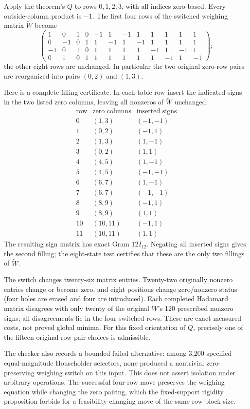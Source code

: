 Apply the theorem's $Q$ to rows $0,1,2,3$, with all indices zero-based.
Every outside-column product is $-1$. The first four rows of the
switched weighing matrix $\widetilde W$ become
\[
\begin{pmatrix}
1&0&1&0&-1&1&-1&1&1&1&1&1\\
0&-1&0&1&1&-1&1&-1&1&1&1&1\\
-1&0&1&0&1&1&1&1&-1&1&-1&1\\
0&1&0&1&1&1&1&1&1&-1&1&-1
\end{pmatrix};
\]
the other eight rows are unchanged. In particular the two original
zero-row pairs are reorganized into pairs $(0,2)$ and $(1,3)$.

Here is a complete filling certificate. In each table row insert
the indicated signs in the two listed zero columns, leaving all
nonzeros of $\widetilde W$ unchanged:
\[
\begin{array}{c|c|c}
\text{row}&\text{zero columns}&\text{inserted signs}\\\hline
0&(1,3)&(-1,-1)\\1&(0,2)&(-1,1)\\
2&(1,3)&(1,-1)\\3&(0,2)&(1,1)\\
4&(4,5)&(1,-1)\\5&(4,5)&(-1,-1)\\
6&(6,7)&(1,-1)\\7&(6,7)&(-1,-1)\\
8&(8,9)&(-1,1)\\9&(8,9)&(1,1)\\
10&(10,11)&(-1,1)\\11&(10,11)&(1,1)
\end{array}
\]
The resulting sign matrix has exact Gram $12I_{12}$. Negating
all inserted signs gives the second filling; the eight-state test
certifies that these are the only two fillings of $\widetilde W$.

The switch changes twenty-six matrix entries. Twenty-two originally
nonzero entries change or become zero, and eight positions change
zero/nonzero status (four holes are erased and four are introduced).
Each completed Hadamard matrix disagrees with only twenty of the
original $W$'s 120 prescribed nonzero signs; all disagreements lie
in the four switched rows. These are exact measured costs, not
proved global minima. For this fixed orientation of $Q$, precisely
one of the fifteen original row-pair choices is admissible.

The checker also records a bounded failed alternative: among 3,200
specified equal-magnitude Householder selectors, none produced a
nontrivial zero-preserving weighing switch on this input. This does
not assert isolation under arbitrary operations. The successful
four-row move preserves the weighing equation while changing the
zero pairing, which the fixed-support rigidity proposition forbids
for a feasibility-changing move of the same row-block size.

